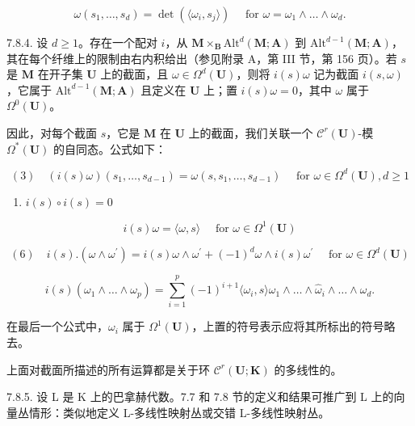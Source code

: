 \[
\omega (s _ {1}, \dots , s _ {d}) = \det (\langle \omega_ {i}, s _ {j} \rangle) \quad \text {   for   } \omega = \omega_ {1} \wedge \dots \wedge \omega_ {d}.\tag{2}
\]

7.8.4. 设 \(d \geqslant 1\)。存在一个配对 \(i\)，从 \(\mathbf{M} \times_{\mathbf{B}} \mathrm{Alt}^{d}(\mathbf{M}; \mathbf{A})\) 到 \(\mathrm{Alt}^{d-1}(\mathbf{M}; \mathbf{A})\)，其在每个纤维上的限制由右内积给出（参见附录 A，第 III 节，第 156 页）。若 \(s\) 是 \(\mathbf{M}\) 在开子集 \(\mathbf{U}\) 上的截面，且 \(\omega \in \Omega^{d}(\mathbf{U})\)，则将 \(i(s)\omega\) 记为截面 \(i(s, \omega)\)，它属于 \(\mathrm{Alt}^{d-1}(\mathbf{M}; \mathbf{A})\) 且定义在 \(\mathbf{U}\) 上；置 \(i(s)\omega = 0\)，其中 \(\omega\) 属于 \(\Omega^{0}(\mathbf{U})\)。

因此，对每个截面 \(s\)，它是 \(\mathbf{M}\) 在 \(\mathbf{U}\) 上的截面，我们关联一个 \(\mathcal{C}^r (\mathbf{U})\)-模 \(\Omega^{*}(\mathbf{U})\) 的自同态。公式如下：

\[
(3) \quad (i (s) \omega) (s _ {1}, \dots , s _ {d - 1}) = \omega (s, s _ {1}, \dots , s _ {d - 1}) \quad \text { for } \omega \in \Omega^ {d} (\mathbf {U}), d \geqslant 1
\]

\begin{enumerate}
\def\labelenumi{(\arabic{enumi})}
\setcounter{enumi}{3}
\tightlist
\item
  \(i(s)\circ i(s) = 0\)
\end{enumerate}

\[
i (s) \omega = \langle \omega , s \rangle \quad \text { for } \omega \in \Omega^ {1} (\mathbf {U}) \tag {5}
\]

\[
(6) \quad i (s). (\omega \wedge \omega^ {\prime}) = i (s) \omega \wedge \omega^ {\prime} + (- 1) ^ {d} \omega \wedge i (s) \omega^ {\prime} \quad \text { for } \omega \in \Omega^ {d} (\mathbf {U})
\]

\[
i (s) (\omega_ {1} \wedge \dots \wedge \omega_ {p}) = \sum_ {i = 1} ^ {p} (- 1) ^ {i + 1} \langle \omega_ {i}, s \rangle \omega_ {1} \wedge \dots \wedge \hat {\omega} _ {i} \wedge \dots \wedge \omega_ {d}.\tag{7}
\]

在最后一个公式中，\(\omega_{i}\) 属于 \(\Omega^{1}(\mathbf{U})\)，上置的符号表示应将其所标出的符号略去。

上面对截面所描述的所有运算都是关于环 \(\mathcal{C}^r (\mathbf{U};\mathbf{K})\) 的多线性的。

7.8.5. 设 L 是 K 上的巴拿赫代数。7.7 和 7.8 节的定义和结果可推广到 L 上的向量丛情形：类似地定义 L-多线性映射丛或交错 L-多线性映射丛。

